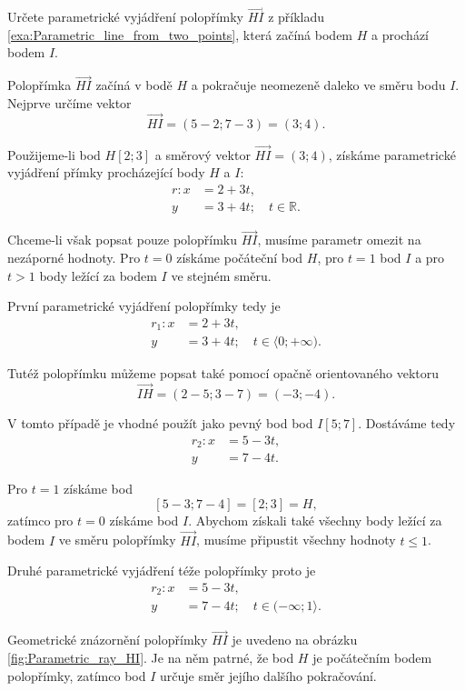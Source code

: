 \begin{example}\label{exa:Parametric_ray_through_two_points}
    Určete parametrické vyjádření polopřímky $\overrightarrow{HI}$
    z příkladu \ref{exa:Parametric_line_from_two_points}, která začíná
    bodem $H$ a prochází bodem $I$.

    Polopřímka $\overrightarrow{HI}$ začíná v bodě $H$ a pokračuje
    neomezeně daleko ve směru bodu $I$. Nejprve určíme vektor
    \[
        \overrightarrow{HI}
        =(5-2;7-3)
        =(3;4).
    \]

    Použijeme-li bod $H[2;3]$ a směrový vektor
    $\overrightarrow{HI}=(3;4)$, získáme parametrické vyjádření
    přímky procházející body $H$ a $I$:
    \begin{align*}
        r: x &= 2+3t,\\
           y &= 3+4t;\quad t\in\mathbb{R}.
    \end{align*}

    Chceme-li však popsat pouze polopřímku $\overrightarrow{HI}$,
    musíme parametr omezit na nezáporné hodnoty. Pro $t=0$ získáme
    počáteční bod $H$, pro $t=1$ bod $I$ a pro $t>1$ body ležící
    za bodem $I$ ve stejném směru.

    První parametrické vyjádření polopřímky tedy je
    \begin{align*}
        r_1: x &= 2+3t,\\
             y &= 3+4t;
             \quad t\in\langle 0;+\infty).
    \end{align*}

    Tutéž polopřímku můžeme popsat také pomocí opačně orientovaného
    vektoru
    \[
        \overrightarrow{IH}
        =(2-5;3-7)
        =(-3;-4).
    \]

    V tomto případě je vhodné použít jako pevný bod bod $I[5;7]$.
    Dostáváme tedy
    \begin{align*}
        r_2: x &= 5-3t,\\
             y &= 7-4t.
    \end{align*}

    Pro $t=1$ získáme bod
    \[
        [5-3;7-4]=[2;3]=H,
    \]
    zatímco pro $t=0$ získáme bod $I$. Abychom získali také všechny
    body ležící za bodem $I$ ve směru polopřímky $\overrightarrow{HI}$,
    musíme připustit všechny hodnoty $t\leq 1$.

    Druhé parametrické vyjádření téže polopřímky proto je
    \begin{align*}
        r_2: x &= 5-3t,\\
             y &= 7-4t;
             \quad t\in(-\infty;1\rangle.
    \end{align*}

    Geometrické znázornění polopřímky $\overrightarrow{HI}$ je uvedeno na obrázku \ref{fig:Parametric_ray_HI}. 
    Je na něm patrné, že bod $H$ je počátečním bodem polopřímky, zatímco bod $I$ určuje směr jejího dalšího pokračování.
\end{example}

